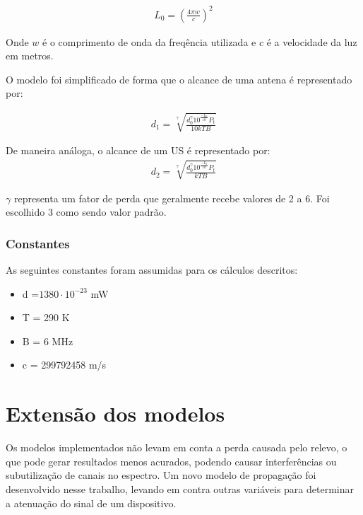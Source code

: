 \begin{align}
  \label{L0} L_0 = \left( \frac{4\pi w}{c}\right)^{2}
\end{align}

Onde \begin{math}w\end{math} é o comprimento de onda da freqência utilizada e \begin{math}c\end{math} é a velocidade da luz em metros.

O modelo foi simplificado de forma que o alcance de uma antena é representado por:

\begin{align}
  \label{dLogDistAnt} d_1 = \sqrt[\gamma]{\frac{d_0^{\gamma}10^{\frac{-L_0}{10}}  P_t}{10kTB}}
\end{align}

De maneira análoga, o alcance de um US é representado por:
\begin{align}
  \label{dLogDistDev} d_2 = \sqrt[\gamma]{\frac{d_0^{\gamma}10^{\frac{-L_0}{10}}  P_t}{kTB}}
\end{align}

\begin{math}\gamma \end{math} representa um fator de perda que geralmente recebe valores de 2 a 6. Foi escolhido 3 como sendo valor padrão.

\subsubsection{Constantes}

As seguintes constantes foram assumidas para os cálculos descritos:

\begin{itemize}
\item d =\begin{math}1380\cdot 10^{-23}\end{math}  mW
\item T = 290 K
\item B = 6 MHz
\item c = 299792458 m/s
\end{itemize}

\section{Extensão dos modelos}

Os modelos implementados não levam em conta a perda causada pelo relevo, o que pode gerar resultados menos acurados, podendo causar interferências ou subutilização de canais no espectro. Um novo modelo de propagação foi desenvolvido nesse trabalho, levando em contra outras variáveis para determinar a atenuação do sinal de um dispositivo.

